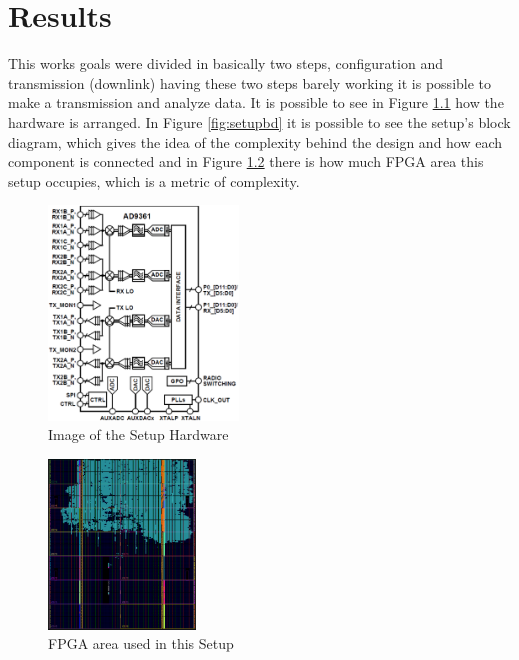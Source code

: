 \chapter{Results}
\label{chap:results}

This works goals were divided in basically two steps, configuration and
transmission (downlink) having these two steps barely working it is possible to
make a transmission and analyze data. It is possible to see in Figure
\ref{fig:setup} how the hardware is arranged. In Figure \ref{fig:setupbd} it is
possible to see the setup's block diagram, which gives the idea of the
complexity behind the design and how each component is connected and in Figure
\ref{fig:fpgaarea} there is how much FPGA area this setup occupies, which is a
metric of complexity.

\begin{figure}[htbp]
    \centering
    \includegraphics[width=0.45\textwidth]{./figures/ad9361_functional_diagram}
    \caption{ Image of the Setup Hardware
    \label{fig:setup}}
\end{figure}

\begin{figure}[htbp]
    \centering
    \includegraphics[width=0.35\textwidth]{./figures/fpga_area}
    \caption{ FPGA area used in this Setup
    \label{fig:fpgaarea}}
\end{figure}


